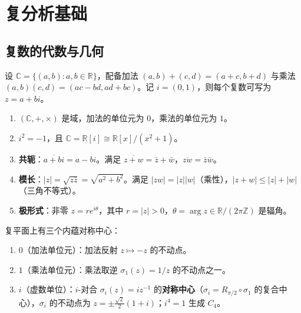 \section{复分析基础}\label{sec:complex_analysis}

\subsection{复数的代数与几何}

\begin{definition}[复数域]\label{def:complex_field}
设 $\mathbb{C} = \{(a, b) : a, b \in \mathbb{R}\}$，配备加法 $(a,b)+(c,d) = (a+c, b+d)$ 与乘法 $(a,b)(c,d) = (ac - bd, ad + bc)$。记 $i = (0,1)$，则每个复数可写为 $z = a + bi$。
\end{definition}

\begin{property}[复数域的基本性质]\label{prop:complex_field_props}
\begin{enumerate}[label=(\roman*)]
    \item $(\mathbb{C}, +, \times)$ 是域，加法的单位元为 $0$，乘法的单位元为 $1$。
    \item $i^2 = -1$，且 $\mathbb{C} = \mathbb{R}[i] \cong \mathbb{R}[x]/(x^2+1)$。
    \item \textbf{共轭}：$\overline{a+bi} = a - bi$。满足 $\overline{z+w} = \bar z + \bar w$，$\overline{zw} = \bar z \bar w$。
    \item \textbf{模长}：$|z| = \sqrt{z\bar z} = \sqrt{a^2+b^2}$。满足 $|zw| = |z||w|$（乘性），$|z+w| \le |z|+|w|$（三角不等式）。
    \item \textbf{极形式}：非零 $z = re^{i\theta}$，其中 $r = |z| > 0$，$\theta = \arg z \in \mathbb{R}/(2\pi\mathbb{Z})$ 是辐角。
\end{enumerate}
\end{property}

\begin{definition}[复平面上的三种对称中心]\label{def:complex_centres}
复平面上有三个内蕴对称中心：
\begin{enumerate}[label=(\roman*)]
    \item $0$（加法单位元）：加法反射 $z \mapsto -z$ 的不动点。
    \item $1$（乘法单位元）：乘法取逆 $\sigma_1(z) = 1/z$ 的不动点之一。
    \item $i$（虚数单位）：$i$-对合 $\sigma_i(z) = i z^{-1}$ 的\textbf{对称中心}（$\sigma_i = R_{\pi/2}\circ\sigma_1$ 的复合中心），$\sigma_i$ 的不动点为 $z = \pm\frac{\sqrt2}{2}(1+i)$；$i^4 = 1$ 生成 $C_4$。
\end{enumerate}
\end{definition}

